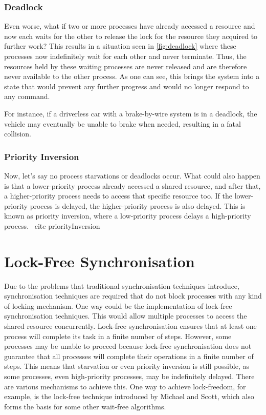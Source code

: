 \subsubsection{Deadlock}\label{subsubsec:deadlock}

Even worse, what if two or more processes have already accessed a resource and now each waits for the other to release the lock for the resource they acquired to further work? This results in a situation seen in \cref{fig:deadlock} where these processes now indefinitely wait for each other and never terminate. Thus, the resources held by these waiting processes are never released and are therefore never available to the other process. As one can see, this brings the system into a state that would prevent any further progress and would no longer respond to any command. \cite{chahar2013deadlock}

For instance, if a driverless car with a brake-by-wire system is in a deadlock, the vehicle may eventually be unable to brake when needed, resulting in a fatal collision. 


\subsubsection{Priority Inversion}\label{subsubsec:priority-inversion}

Now, let's say no process starvations or deadlocks occur. What could also happen is that a lower-priority process already accessed a shared resource, and after that, a higher-priority process needs to access that specific resource too. If the lower-priority process is delayed, the higher-priority process is also delayed. This is known as priority inversion, where a low-priority process delays a high-priority process. \ cite {priorityInversion} \cite{priorityInversion}

\section{Lock-Free Synchronisation}\label{sec:lock-free}

Due to the problems that traditional synchronisation techniques introduce, synchronisation techniques are required that do not block processes with any kind of locking mechanism. One way could be the implementation of lock-free synchronisation techniques. This would allow multiple processes to access the shared resource concurrently. Lock-free synchronisation ensures that at least one process will complete its task in a finite number of steps. However, some processes may be unable to proceed because lock-free synchronisation does not guarantee that all processes will complete their operations in a finite number of steps. This means that starvation or even priority inversion is still possible, as some processes, even high-priority processes, may be indefinitely delayed. There are various mechanisms to achieve this. One way to achieve lock-freedom, for example, is the lock-free technique introduced by Michael and Scott, which also forms the basis for some other wait-free algorithms.

